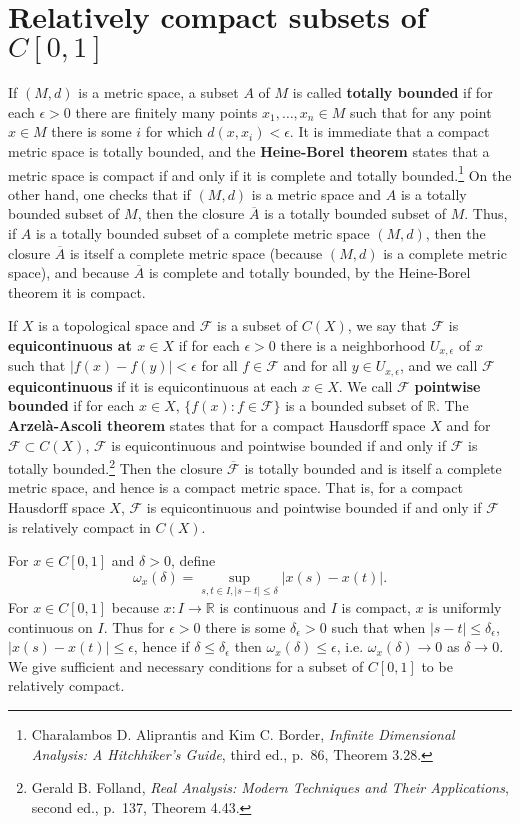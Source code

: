 \documentclass{article}
\theoremstyle{definition}
\theoremstyle{definition}
\begin{document}
\section{Relatively compact subsets of $C[0,1]$}
If $(M,d)$ is a metric space, a subset $A$ of $M$ is called \textbf{totally bounded} if for 
each $\epsilon>0$ there are finitely many points $x_1,\ldots,x_n \in M$ such that for any 
point $x \in M$ there is some $i$ for which $d(x,x_i)<\epsilon$. 
It is immediate that a compact metric space is totally bounded, and the \textbf{Heine-Borel theorem} states that
a metric space is compact if and only if it is complete and totally bounded.\footnote{Charalambos D. Aliprantis
and Kim C. Border, {\em Infinite Dimensional Analysis: A Hitchhiker's Guide}, third ed., p.~86, Theorem 3.28.}
On the other hand, one checks that if $(M,d)$ is a metric space and $A$ is a totally bounded subset of $M$, then
the closure $\overline{A}$ is a totally bounded subset of $M$. 
Thus, if $A$ is a totally bounded subset of a complete metric space $(M,d)$, then 
the closure $\overline{A}$ is itself a complete metric space (because $(M,d)$ is a complete metric space), and because $\overline{A}$ is complete and totally bounded, by the Heine-Borel
theorem it is compact.

If $X$ is a topological space and $\mathscr{F}$ is a subset of $C(X)$, we say that
$\mathscr{F}$ is \textbf{equicontinuous at $x \in X$} if for each $\epsilon>0$ there
is a neighborhood $U_{x,\epsilon}$ of $x$ such that $|f(x)-f(y)|<\epsilon$ for all $f \in \mathscr{F}$ and for all
$y \in U_{x,\epsilon}$, and we call $\mathscr{F}$ \textbf{equicontinuous} if it is equicontinuous at each $x \in X$.  
We call $\mathscr{F}$ \textbf{pointwise bounded} if for each $x \in X$, $\{f(x): f \in \mathscr{F}\}$ is a bounded subset
of $\mathbb{R}$. 
The \textbf{Arzel\`a-Ascoli theorem} states that for a compact Hausdorff space $X$ and for $\mathscr{F} \subset C(X)$,
$\mathscr{F}$ is equicontinuous and pointwise bounded if and only if $\mathscr{F}$ is totally bounded.\footnote{Gerald B. Folland, {\em Real
Analysis: Modern Techniques and Their Applications}, second ed., p.~137, Theorem 4.43.}
Then the closure $\overline{\mathscr{F}}$ is totally bounded and is itself a complete metric space, and hence
is a compact metric space. That is, for a compact Hausdorff space $X$, $\mathscr{F}$ is equicontinuous and pointwise bounded if and only if  $\mathscr{F}$ is relatively compact  in $C(X)$.

For $x \in C[0,1]$ and $\delta>0$, define
\[
\omega_x(\delta) = \sup_{s,t \in I, |s-t| \leq \delta} |x(s)-x(t)|.
\]
For $x \in C[0,1]$ because $x:I \to \mathbb{R}$ is continuous and $I$ is compact,
$x$ is uniformly continuous on $I$. Thus
for $\epsilon>0$ there is some $\delta_\epsilon>0$ such that when $|s-t| \leq \delta_\epsilon$,
$|x(s)-x(t)| \leq \epsilon$, hence
if $\delta \leq \delta_\epsilon$ then $\omega_x(\delta) \leq \epsilon$, i.e.
$\omega_x(\delta) \to 0$ as $\delta \to 0$.  We give sufficient and necessary conditions for a subset of $C[0,1]$ to be relatively compact.
\end{document}
